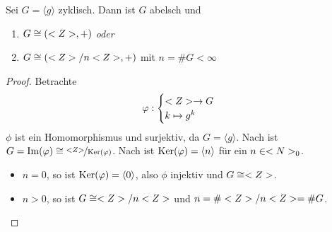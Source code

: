 \begin{proposition}
	Sei $G=\langle g\rangle$ zyklisch. Dann ist $G$ abelsch und
	\begin{enumerate}[label=(\alph*)]
		\item $G\cong (<Z>,+)$ \emph{oder}
		\item $G\cong (<Z>/n<Z>,+)$ mit $n=\#G<\infty$
	\end{enumerate}
\end{proposition}
\begin{proof}
	Betrachte 
	\begin{align}
		\varphi: \begin{cases}
		<Z>\to G\\ k\mapsto g^k
		\end{cases}\notag
	\end{align}
	$\phi$ ist ein Homomorphismus und surjektiv, da $G=\langle g\rangle$. Nach  ist $G=\operatorname{Im}(\varphi)\cong \nicefrac{<Z>}{\operatorname{Ker}(\varphi)}$. Nach  ist $\operatorname{Ker}(\varphi)=\langle n\rangle$ für ein $n\in<N>_0$.
	\begin{itemize}
		\item \emph{$n=0$}, so ist $\operatorname{Ker}(\varphi)=\langle 0\rangle$, also $\phi$ injektiv und $G\cong<Z>$.
		\item \emph{$n>0$}, so ist $G\cong<Z>/n<Z>$ und $n=\#<Z>/n<Z>=\#G$.
	\end{itemize}
\end{proof}